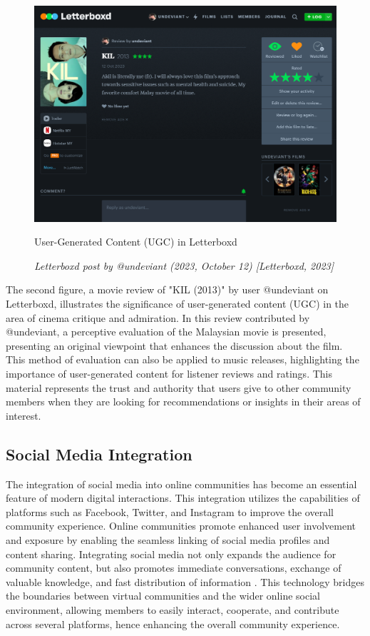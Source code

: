 \begin{figure}[h]
    \centering
    \includegraphics[width=0.9\linewidth]{mainmatter/images/ugc2.png}
    \caption{User-Generated Content (UGC) in Letterboxd}
    \caption*{\textit{Letterboxd post by @undeviant (2023, October 12) [Letterboxd, 2023]}}
    \label{fig:myfig4}
\end{figure}
The second figure, a movie review of "KIL (2013)" by user @undeviant on Letterboxd, illustrates the significance of user-generated content (UGC) in the area of cinema critique and admiration. In this review contributed by @undeviant, a perceptive evaluation of the Malaysian movie is presented, presenting an original viewpoint that enhances the discussion about the film. This method of evaluation can also be applied to music releases, highlighting the importance of user-generated content for listener reviews and ratings. This material represents the trust and authority that users give to other community members when they are looking for recommendations or insights in their areas of interest. \pagebreak

\subsection{Social Media Integration}
The integration of social media into online communities has become an essential feature of modern digital interactions. This integration utilizes the capabilities of platforms such as Facebook, Twitter, and Instagram to improve the overall community experience. Online communities promote enhanced user involvement and exposure by enabling the seamless linking of social media profiles and content sharing. Integrating social media not only expands the audience for community content, but also promotes immediate conversations, exchange of valuable knowledge, and fast distribution of information \parencite{zanuar22}. This technology bridges the boundaries between virtual communities and the wider online social environment, allowing members to easily interact, cooperate, and contribute across several platforms, hence enhancing the overall community experience.

